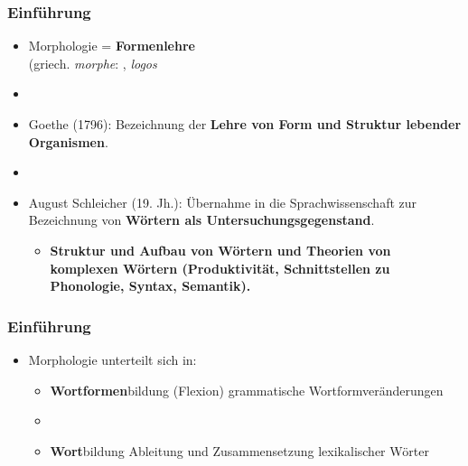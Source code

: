 \begin{frame}
\frametitle{Einführung}

\begin{itemize}
	\item Morphologie = \textbf{Formenlehre} \\
	(griech. \emph{morphe}: , \emph{logos} 
	\item[]
	\item Goethe (1796): Bezeichnung der \textbf{Lehre von Form und Struktur lebender Organismen}.
	\item[]
	\item August Schleicher (19. Jh.): Übernahme in die Sprachwissenschaft zur Bezeichnung von \textbf{Wörtern als Untersuchungsgegenstand}.
	
	\begin{itemize}
		\item \ras \bf{Struktur und Aufbau von Wörtern} und \bf{Theorien von komplexen Wörtern} (Produktivität, Schnittstellen zu Phonologie, Syntax, Semantik).
	\end{itemize}
\end{itemize}


\end{frame}


\begin{frame}
\frametitle{Einführung}

\begin{itemize}
	\item Morphologie unterteilt sich in:
	
	\begin{itemize}
		\item \textbf{Wortformen}bildung (Flexion) \ras grammatische Wortformveränderungen
		\item[]
		\item \textbf{Wort}bildung \ras Ableitung und Zusammensetzung lexikalischer Wörter
	\end{itemize}
\end{itemize}

\begin{figure}	
\centering
\scalebox{0.55}{
\begin{forest} %
sn edges,
	[Morphologie
		[Flexion
			[Konjugation] 
			[Deklination]]
		[Wortbildung
			[Komposition
				[Determinativ]
				[Kopulativ]
				[\dots]]
			[Derivation
				[Suffigierung]
				[Präfigierung]
				[\dots]]
			[Konversion
				[morphologisch]
				[syntaktisch]]
			[Rückbildung]
			[\dots]]]										
\end{forest}}
\end{figure}


\end{frame}


